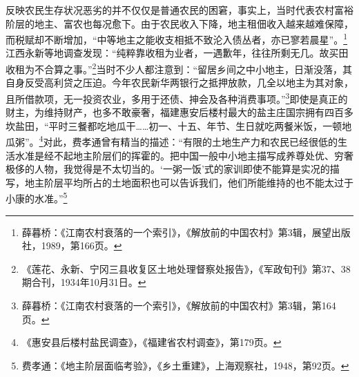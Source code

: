 反映农民生存状况恶劣的并不仅仅是普通农民的困窘，事实上，当时代表农村富裕阶层的地主、富农也每况愈下。由于农民收入下降，地主租佃收入越来越难保障，而税赋却不断增加，“中等地主之能收支相抵不致沦入债丛者，亦已寥若晨星”。\footnote{薛暮桥：《江南农村衰落的一个索引》，《解放前的中国农村》第3辑，展望出版社，1989，第166页。}江西永新等地调查发现：“纯粹靠收租为业者，一遇歉年，往往所剩无几。故买田收租为不合算之事。”\footnote{《莲花、永新、宁冈三县收复区土地处理督察处报告》，《军政旬刊》第37、38期合刊，1934年10月31日。}当时不少人都注意到：“留居乡间之中小地主，日渐没落，其自身反受高利贷之压迫。今年农民新华两银行之抵押放款，几全以地主为其对象，且所借款项，无一投资农业，多用于还债、抻会及各种消费事项。”\footnote{薛暮桥：《江南农村衰落的一个索引》，《解放前的中国农村》第3辑，第164页。}即使是真正的财主，为维持财产，也多不敢豪奢，福建惠安后楼村最大的盐主庄国宗拥有四百多坎盐田，“平时三餐都吃地瓜干……初一、十五、年节、生日就吃两餐米饭，一顿地瓜粥”。\footnote{《惠安县后楼村盐民调查》，《福建省农村调查》，第179页。}对此，费孝通曾有精当的描述：“有限的土地生产力和农民已经很低的生活水准是经不起地主阶层们的挥霍的。把中国一般中小地主描写成养尊处优、穷奢极侈的人物，我觉得是不太切当的。‘一粥一饭’式的家训即使不能算是实况的描写，地主阶层平均所占的土地面积也可以告诉我们，他们所能维持的也不能太过于小康的水准。”\footnote{费孝通：《地主阶层面临考验》，《乡土重建》，上海观察社，1948，第92页。}


